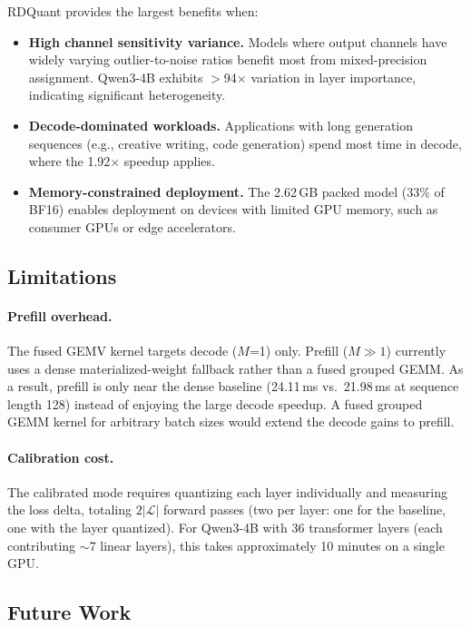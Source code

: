 \documentclass{article}
\begin{document}
RDQuant provides the largest benefits when:
\begin{itemize}
    \item \textbf{High channel sensitivity variance.} Models where output channels have widely varying outlier-to-noise ratios benefit most from mixed-precision assignment.
    Qwen3-4B exhibits $>$94$\times$ variation in layer importance, indicating significant heterogeneity.
    \item \textbf{Decode-dominated workloads.} Applications with long generation sequences (e.g., creative writing, code generation) spend most time in decode, where the 1.92$\times$ speedup applies.
    \item \textbf{Memory-constrained deployment.} The 2.62\,GB packed model (33\% of BF16) enables deployment on devices with limited GPU memory, such as consumer GPUs or edge accelerators.
\end{itemize}

\subsection{Limitations}

\paragraph{Prefill overhead.}
The fused GEMV kernel targets decode ($M$=1) only.
Prefill ($M \gg 1$) currently uses a dense materialized-weight fallback rather than a fused grouped GEMM.
As a result, prefill is only near the dense baseline (24.11\,ms vs.\ 21.98\,ms at sequence length 128) instead of enjoying the large decode speedup.
A fused grouped GEMM kernel for arbitrary batch sizes would extend the decode gains to prefill.

\paragraph{Calibration cost.}
The calibrated mode requires quantizing each layer individually and measuring the loss delta, totaling $2|\mathcal{L}|$ forward passes (two per layer: one for the baseline, one with the layer quantized).
For Qwen3-4B with 36 transformer layers (each contributing $\sim$7 linear layers), this takes approximately 10 minutes on a single GPU.

\subsection{Future Work}
\end{document}
